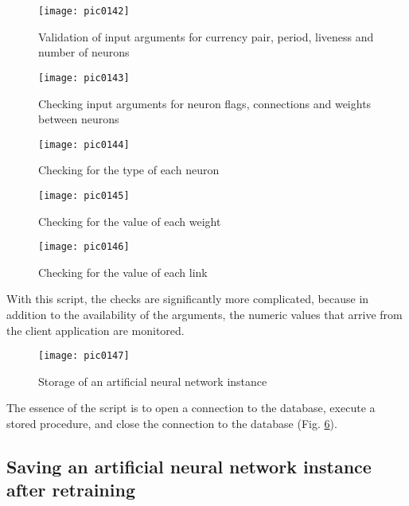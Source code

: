 \begin{figure}[h]
\centering
\texttt{[image: pic0142]}
\caption{Validation of input arguments for currency pair, period, liveness and number of neurons}
\label{fig:pic0142}
\end{figure}
\FloatBarrier

\begin{figure}[h]
\centering
\texttt{[image: pic0143]}
\caption{Checking input arguments for neuron flags, connections and weights between neurons}
\label{fig:pic0143}
\end{figure}
\FloatBarrier

\begin{figure}[h]
\centering
\texttt{[image: pic0144]}
\caption{Checking for the type of each neuron}
\label{fig:pic0144}
\end{figure}
\FloatBarrier

\begin{figure}[h]
\centering
\texttt{[image: pic0145]}
\caption{Checking for the value of each weight}
\label{fig:pic0145}
\end{figure}
\FloatBarrier

\begin{figure}[h]
\centering
\texttt{[image: pic0146]}
\caption{Checking for the value of each link}
\label{fig:pic0146}
\end{figure}
\FloatBarrier

With this script, the checks are significantly more complicated, because in addition to the availability of the arguments, the numeric values that arrive from the client application are monitored.

\begin{figure}[h]
\centering
\texttt{[image: pic0147]}
\caption{Storage of an artificial neural network instance}
\label{fig:pic0147}
\end{figure}
\FloatBarrier

The essence of the script is to open a connection to the database, execute a stored procedure, and close the connection to the database (Fig. \ref{fig:pic0147}).

\subsection{Saving an artificial neural network instance after retraining}

